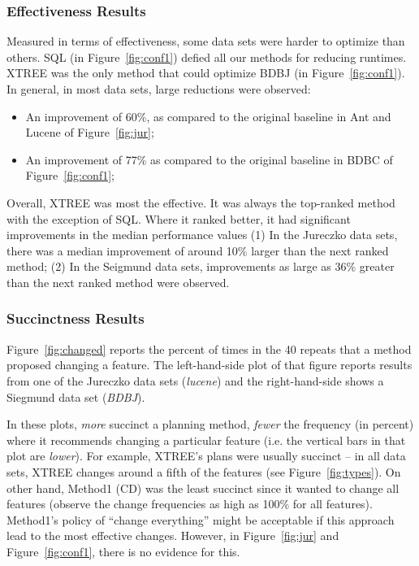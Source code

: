 \documentclass{sig-alternate}
\newcommand{\bi}{\begin{itemize}}
\newcommand{\ei}{\end{itemize}}
\newcommand{\fig}[1]{Figure~\ref{fig:#1}}
\begin{document}
\subsubsection{Effectiveness Results}


Measured in terms of effectiveness,
some data sets were harder to optimize than others.  SQL (in \fig{conf1}) defied all 
our methods for reducing runtimes. XTREE was the only method that could optimize BDBJ (in \fig{conf1}). In general, in most data sets,
large reductions were observed:
\bi
\item
An improvement of 60\%, as compared to the original baseline in Ant and Lucene of \fig{jur};
\item
An improvement of 77\% as compared to the original baseline in BDBC  of \fig{conf1};
\ei

Overall, XTREE was most the effective. It was always the top-ranked method with 
the exception of SQL. Where it ranked better, it had significant improvements in the median performance values (1) In the Jureczko data sets, there was a median improvement of around 10\% larger than the next ranked method; (2) In the Seigmund data sets, improvements as large as 36\% greater than the next ranked method were observed.

\subsubsection{Succinctness Results}



\fig{changed} reports the percent of times in the 40 repeats that a method proposed changing a feature.
The left-hand-side plot of that figure reports results from one of the  Jureczko data sets ({\em lucene}) and the right-hand-side
  shows a Siegmund data set ({\em BDBJ}). 
  
  In these plots, {\em more} succinct a planning method, {\em fewer} the frequency (in percent) where it recommends changing a particular feature (i.e. the vertical bars in that plot
  are {\em lower}). For example,
  XTREE's plans were usually succinct --  in all  data sets,
 XTREE   changes around a fifth of the features (see \fig{types}).
On other hand,  Method1 (CD) was the least succinct  since it  wanted to change all features 
 (observe the change frequencies as 
high as 100\% for all features). 
Method1's policy of ``change everything''  might be acceptable
if this approach lead 
to the most effective changes. However, in
\fig{jur} and  \fig{conf1}, there is no evidence for this.  
 
\end{document}

